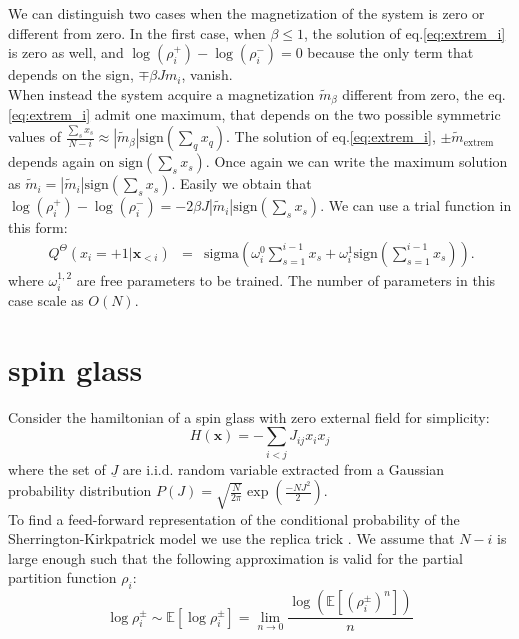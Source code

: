 \documentclass{article}
\begin{document}
We can distinguish two cases when the magnetization of the system is zero or different from zero. 
In the first case, when $\beta\leq1$, the solution of eq.\ref{eq:extrem_i} is zero as well, and $\log(\rho_i^{+}) - \log(\rho_i^{-})=0$ because the only term that depends on the sign, $\mp \beta J m_i$, vanish.\\ 
When instead the system acquire a magnetization $\tilde{m}_{\beta}$ different from zero, the eq.\ref{eq:extrem_i} admit one maximum, that depends on the two possible symmetric values of $\frac{\sum_s x_s}{N-i}\approx |\tilde{m}_{\beta}| \text{sign}(\sum_q x_q)$. 
The solution of eq.\ref{eq:extrem_i}, $\pm \tilde{m}_{\text{extrem}}$ depends again on $\text{sign}(\sum_s x_s)$. 
Once again we can write the maximum solution as $\tilde{m}_{i}=|\tilde{m}_i| \text{sign}(\sum_s x_s)$. 
Easily we obtain that $\log(\rho_i^{+}) - \log(\rho_i^{-}) = -2\beta J|\tilde{m}_i| \text{sign}(\sum_s x_s)$. 
We can use a trial function in this form:
\begin{eqnarray}\
\label{eq:curie_weiss_cond2}
Q^{\Theta}\left(x_{i}=+1|\mathbf{x}_{<i}\right) & = & \text{sigma}\left(\omega_{i}^0\sum_{s=1}^{i-1}x_{s} + \omega_i^1 \text{sign}(\sum_{s=1}^{i-1}x_{s})\right).
\end{eqnarray}
where $\omega_i^{1,2}$ are free parameters to be trained. The number of parameters in this case scale as $O(N)$.

\section{spin glass}
Consider the hamiltonian of a spin glass with zero external field for simplicity:
\begin{equation}
H\left(\mathbf{x}\right)=-\sum_{i<j}J_{ij}x_{i}x_{j}
\end{equation}
where the set of $\underline{J}$ are i.i.d. random variable extracted from a Gaussian probability distribution $P(J)=\sqrt{\frac{N}{2\pi}}\exp\left(\frac{-NJ^2}{2} \right)$. \\
To find a feed-forward representation of the conditional probability of the Sherrington-Kirkpatrick model we use the replica trick \cite{}. We assume that $N-i$ is large enough such that the following approximation is valid for the partial partition function $\rho_i$: 
\[
\log\rho_i^{\pm} \sim \mathbb{E}\left[  \log\rho_i^{\pm} \right] = \lim_{n\rightarrow 0} \frac{  \log(\mathbb{E}\left[(\rho_i^{\pm})^n \right])}{n}
\]
\end{document}
